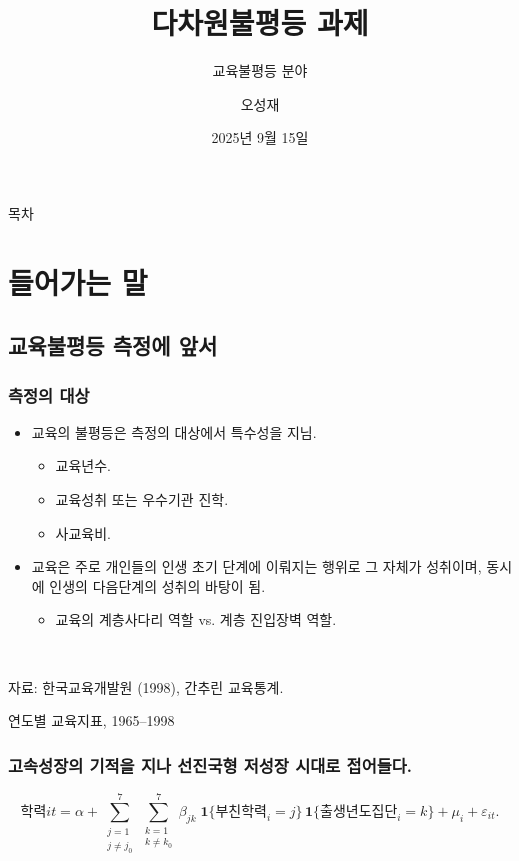 \documentclass[aspectratio=169,xcolor=dvipsnames,handout]{beamer}
\title{다차원불평등 과제}
\subtitle{교육불평등 분야}
\author{오성재}
\institute[KIHASA]
    {%
        국회입법조사처
    }
\date{2025년 9월 15일}
\begin{document}

\frame{\titlepage}

\begin{frame}{목차}
    \setcounter{tocdepth}{1}
    \tableofcontents
\end{frame}

\section{들어가는 말}
\subsection{교육불평등 측정에 앞서}
\begin{frame}[<+->]
\frametitle{측정의 대상}
    \begin{itemize}
        \item 교육의 불평등은 측정의 대상에서 특수성을 지님.
        \begin{itemize}[<+->]
            \item 교육년수.
            \item 교육성취 또는 우수기관 진학.
            \item 사교육비.
        \end{itemize}
        \item 교육은 주로 개인들의 인생 초기 단계에 이뤄지는 행위로 그 자체가 성취이며, 동시에 인생의 다음단계의 성취의 바탕이 됨.
        \begin{itemize}[<+->]
            \item 교육의 계층사다리 역할 vs. 계층 진입장벽 역할.
        \end{itemize}
    \end{itemize}
\end{frame}

\begin{frame}[<+->]
    \begin{table}
        \centering
        \resizebox{.7\textwidth}{!}{\relax
            
        }
        \\
        \raggedright%
        \hspace{1.5em}
        \tiny{자료: 한국교육개발원 (1998), 간추린 교육통계.}
        \caption{연도별 교육지표, 1965--1998}
    \end{table}
\end{frame}

\begin{frame}[<+->]
\frametitle{고속성장의 기적을 지나 선진국형 저성장 시대로 접어들다.}
    \[
        \text{학력}{it}
    = \alpha
    + \sum_{\substack{j=1\\ j\neq j_0}}^{7}
    \sum_{\substack{k=1\\ k\neq k_0}}^{7}
    \beta_{jk}\;
    \mathbf{1}\!\{\text{부친학력}_i=j\}\,\mathbf{1}\!\{\text{출생년도집단}_i=k\}
    + \mu_i + \varepsilon_{it}.
    \]
\end{frame}
\end{document}
